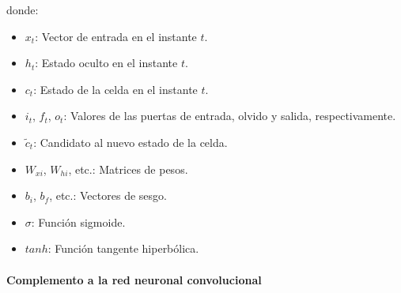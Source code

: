 


donde:

\begin{itemize}
    \item $x_t$: Vector de entrada en el instante $t$.
    \item $h_t$: Estado oculto en el instante $t$.
    \item $c_t$: Estado de la celda en el instante $t$.
    \item $i_t$, $f_t$, $o_t$:  Valores de las puertas de entrada, olvido y salida, respectivamente.
    \item $\tilde{c}_t$:  Candidato al nuevo estado de la celda.
    \item $W_{xi}$, $W_{hi}$, etc.: Matrices de pesos.
    \item $b_i$, $b_f$, etc.: Vectores de sesgo.
    \item $\sigma$: Función sigmoide.
    \item $tanh$: Función tangente hiperbólica.
\end{itemize}

\paragraph{Complemento a la red neuronal convolucional}

